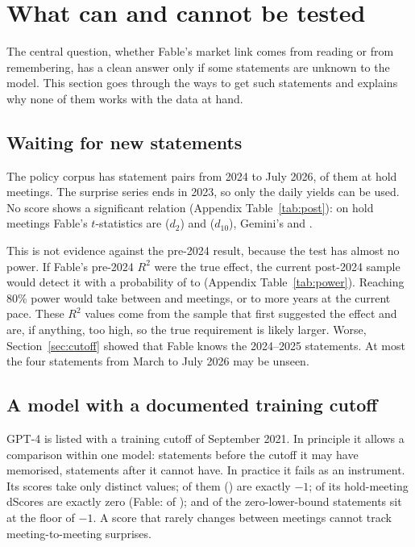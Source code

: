 \section{What can and cannot be tested}\label{sec:cannot}

The central question, whether Fable's market link comes from reading or from remembering, has a clean
answer only if some statements are unknown to the model. This section goes through the ways to get such
statements and explains why none of them works with the data at hand.

\subsection{Waiting for new statements}

The policy corpus has  statement pairs from 2024 to July 2026,  of them at
hold meetings. The surprise series ends in 2023, so only the daily yields can be used. No score shows a
significant relation (Appendix Table~\ref{tab:post}): on hold meetings Fable's $t$-statistics are
 ($d_2$) and  ($d_{10}$), Gemini's
 and .

This is not evidence against the pre-2024 result, because the test has almost no power. If Fable's
pre-2024 $R^2$ were the true effect, the current post-2024 sample would detect it with a probability of
 to  (Appendix Table~\ref{tab:power}). Reaching 80\% power would take between
 and  meetings, or  to
 more years at the current pace. These $R^2$ values come from the sample that
first suggested the effect and are, if anything, too high, so the true requirement is likely larger. Worse, Section~\ref{sec:cutoff}
showed that Fable knows the 2024--2025 statements. At most the four statements from March to July 2026
may be unseen.

\subsection{A model with a documented training cutoff}

GPT-4 is listed with a training cutoff of September 2021. In principle it allows a comparison within one
model: statements before the cutoff it may have memorised, statements after it cannot have. In practice
it fails as an instrument. Its  scores take only  distinct values;
 of them () are exactly $-1$;  of its hold-meeting
dScores are exactly zero (Fable:  of ); and  of the
 zero-lower-bound statements sit at the floor of $-1$. A score that rarely changes between
meetings cannot track meeting-to-meeting surprises.


